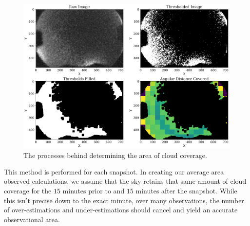 \begin{figure}[ht!]
  \centering
  \includegraphics[scale=0.4]{images/Cloud_analysis.png}
  \caption{The processes behind determining the area of cloud coverage.}
  \label{colorcloud}
\end{figure}




This method is performed for each snapshot.
In creating our average area observed calculations, we assume that the sky retains that same amount of cloud coverage for the $15$ minutes prior to and $15$ minutes after the snapshot.
While this isn't precise down to the exact minute, over many observations, the number of over-estimations and under-estimations should cancel and yield an accurate observational area.























 